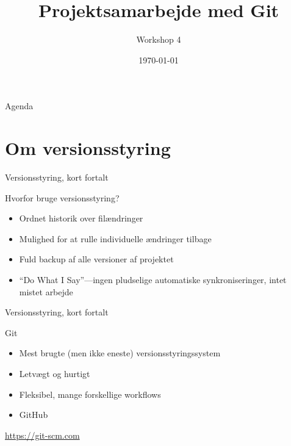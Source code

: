 \documentclass[10pt]{beamer}
\title{Projektsamarbejde med Git}
\subtitle{Workshop 4}
\date{\today}
\begin{document}
{\aauwavesbg
  \begin{frame}
    \titlepage
  \end{frame}}

\begin{frame}{Agenda}
  \tableofcontents
\end{frame}

\section{Om versionsstyring}
\label{sec:about}

\begin{frame}{Versionsstyring, kort fortalt}
  \begin{block}{Hvorfor bruge versionsstyring?}
    \begin{itemize}
    \item Ordnet historik over filændringer
    \item Mulighed for at rulle individuelle ændringer tilbage
    \item Fuld backup af alle versioner af projektet
    \item ``Do What I Say''---ingen pludselige automatiske synkroniseringer, intet mistet arbejde
    \end{itemize}
  \end{block}
\end{frame}

\begin{frame}{Versionsstyring, kort fortalt}
  \begin{block}{Git}
    \begin{itemize}
    \item Mest brugte (men ikke eneste) versionsstyringssystem
    \item Letvægt og hurtigt
    \item Fleksibel, mange forskellige workflows
    \item GitHub
    \end{itemize}
  \end{block}

  \begin{block}{\href{https://git-scm.com}{https://git-scm.com}}
  \end{block}
\end{frame}
\end{document}
